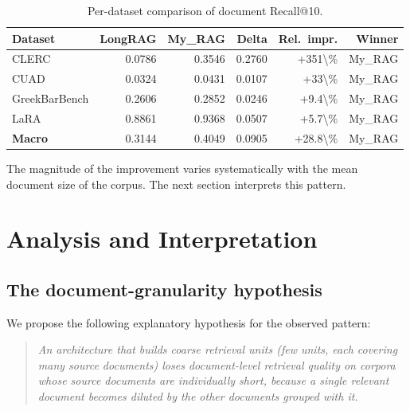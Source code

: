 \documentclass[11pt,a4paper]{article}
\begin{document}
\begin{table}[h]
\centering
\caption{Per-dataset comparison of document Recall@10.}
\label{tab:per-ds}
\small
\begin{tabular}{l r r r r r}
\toprule
\textbf{Dataset} & \textbf{LongRAG} & \textbf{My\_RAG}
  & \textbf{Delta} & \textbf{Rel.\ impr.} & \textbf{Winner} \\
\midrule
CLERC              & \num{0.0786} & \num{0.3546}
                   & \num{+0.2760} & \num{+351\%} & My\_RAG \\
CUAD               & \num{0.0324} & \num{0.0431}
                   & \num{+0.0107} & \num{+33\%}  & My\_RAG \\
GreekBarBench      & \num{0.2606} & \num{0.2852}
                   & \num{+0.0246} & \num{+9.4\%} & My\_RAG \\
LaRA               & \num{0.8861} & \num{0.9368}
                   & \num{+0.0507} & \num{+5.7\%} & My\_RAG \\
\midrule
\textbf{Macro}     & \num{0.3144} & \num{0.4049}
                   & \num{+0.0905} & \num{+28.8\%} & My\_RAG \\
\bottomrule
\end{tabular}
\end{table}

The magnitude of the improvement varies systematically with the mean
document size of the corpus. The next section interprets this
pattern.

\section{Analysis and Interpretation}\label{sec:interp}

\subsection{The document-granularity hypothesis}
We propose the following explanatory hypothesis for the observed
pattern:

\begin{quote}
\emph{An architecture that builds coarse retrieval units (few units,
each covering many source documents) loses document-level retrieval
quality on corpora whose source documents are individually short,
because a single relevant document becomes diluted by the other
documents grouped with it.}
\end{quote}
\end{document}
